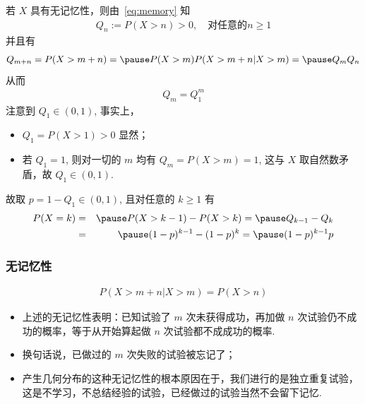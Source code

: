 \documentclass[Prob-All.tex]{subfiles}
\begin{document}
\begin{frame}
	\vspace{0.5cm}
	若 $X$ 具有无记忆性，则由~\eqref{eq:memory} 知
	\pause \begin{eqnarray*}
		Q_n:=P (X>n)>0, \quad \mbox{对任意的} n\ge 1
	\end{eqnarray*}
	\pause 并且有
	\begin{eqnarray*}
		Q_{m+n}=P(X>m+n)=\pause P(X>m)P(X>m+n|X>m)=\pause Q_mQ_n
	\end{eqnarray*}
	\pause 从而 \vspace{-0.7cm}
	\begin{eqnarray*}
		Q_m=Q_1^m
	\end{eqnarray*}
	\pause 注意到 $Q_1\in (0,1)$, 事实上，
	\begin{itemize}[<+-|alert@+>]
		\item $Q_1=P (X>1)>0$ 显然；
		\item  若 $Q_1=1$, 则对一切的 $m$ 均有 $Q_m=P (X>m)=1$, 这与 $X$ 取自然数矛盾，故 $Q_1\in (0,1)$.
	\end{itemize}
	\pause 故取 $p=1-Q_1\in (0,1)$, 且对任意的 $k\ge 1$ 有
	\begin{eqnarray*}
		P(X=k)&=&\pause P(X>k-1)-P(X>k)=\pause Q_{k-1}-Q_k\\
		&=&\pause (1-p)^{k-1}-(1-p)^k=\pause (1-p)^{k-1}p
	\end{eqnarray*}

\end{frame}

\begin{frame}
	\frametitle{无记忆性}
	\begin{eqnarray*}
		P(X>m+n|X>m)=P(X>n)
	\end{eqnarray*}
	\begin{itemize}[<+-|alert@+>]
		\item 上述的无记忆性表明：已知试验了 $m$ 次未获得成功，再加做 $n$ 次试验仍不成功的概率，等于从开始算起做 $n$ 次试验都不成成功的概率.
		\item 换句话说，已做过的 $m$ 次失败的试验被忘记了；
		\item 产生几何分布的这种无记忆性的根本原因在于，我们进行的是独立重复试验，这是不学习，不总结经验的试验，已经做过的试验当然不会留下记忆.
	\end{itemize}
\end{frame}
\end{document}
